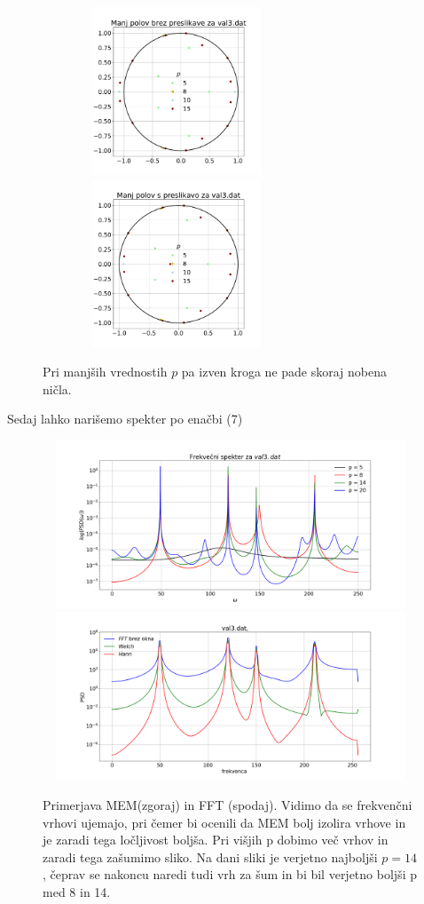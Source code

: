 \documentclass[11pt, a4paper]{article}
\begin{document}
\begin{figure}[H]
\centering
  \includegraphics[width=8cm,height=5cm]{prva_primerjava3.pdf}
  \includegraphics[width=8cm,height=5cm]{prva_primerjava4.pdf}
\caption{Pri manjših vrednostih $p$ pa izven kroga ne pade skoraj nobena ničla.}  
\end{figure}
Sedaj lahko narišemo spekter po enačbi (7)
\begin{figure}[H]
\centering
  \includegraphics[width=16cm,height=5cm]{prva_frekvencni1.png}
  \includegraphics[width=16cm,height=5cm]{prva_tretja1b.png}
\caption{Primerjava MEM(zgoraj) in FFT (spodaj). Vidimo da se frekvenčni vrhovi ujemajo, pri čemer bi ocenili da  MEM bolj izolira vrhove in je zaradi tega ločljivost boljša. Pri višjih p dobimo več vrhov in zaradi tega zašumimo sliko. Na dani sliki je verjetno najboljši $p = 14$, čeprav se nakoncu naredi tudi vrh za šum in bi bil verjetno boljši p med 8 in 14.} 
\end{figure}
\end{document}
